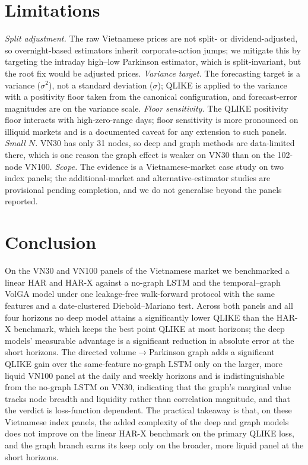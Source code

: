 \documentclass[runningheads]{llncs}
\begin{document}
\section{Limitations}
\emph{Split adjustment.} The raw Vietnamese prices are not split- or dividend-adjusted, so
overnight-based estimators inherit corporate-action jumps; we mitigate this by targeting the intraday
high--low Parkinson estimator, which is split-invariant, but the root fix would be adjusted prices.
\emph{Variance target.} The forecasting target is a variance ($\sigma^2$), not a standard deviation
($\sigma$); QLIKE is applied to the variance with a positivity floor taken from the canonical
configuration, and forecast-error magnitudes are on the variance scale. \emph{Floor sensitivity.} The
QLIKE positivity floor interacts with high-zero-range days; floor sensitivity is more pronounced on
illiquid markets and is a documented caveat for any extension to such panels. \emph{Small $N$.} VN30
has only 31 nodes, so deep and graph methods are data-limited there, which is one reason the graph
effect is weaker on VN30 than on the 102-node VN100. \emph{Scope.} The evidence is a
Vietnamese-market case study on two index panels; the additional-market and alternative-estimator
studies are provisional pending completion, and we do not generalise beyond the panels reported.

\section{Conclusion}
On the VN30 and VN100 panels of the Vietnamese market we benchmarked a linear HAR and HAR-X against a
no-graph LSTM and the temporal--graph VolGA model under one leakage-free walk-forward protocol with
the same features and a date-clustered Diebold--Mariano test. Across both panels and all four
horizons no deep model attains a significantly lower QLIKE than the HAR-X benchmark, which keeps the
best point QLIKE at most horizons; the deep models' measurable advantage is a significant reduction in
absolute error at the short horizons. The directed volume$\to$Parkinson graph adds a significant QLIKE
gain over the same-feature no-graph LSTM only on the larger, more liquid VN100 panel at the daily and
weekly horizons and is indistinguishable from the no-graph LSTM on VN30, indicating that the graph's
marginal value tracks node breadth and liquidity rather than correlation magnitude, and that the
verdict is loss-function dependent. The practical takeaway is that, on these Vietnamese index panels,
the added complexity of the deep and graph models does not improve on the linear HAR-X benchmark on
the primary QLIKE loss, and the graph branch earns its keep only on the broader, more liquid panel at
the short horizons.
\end{document}
